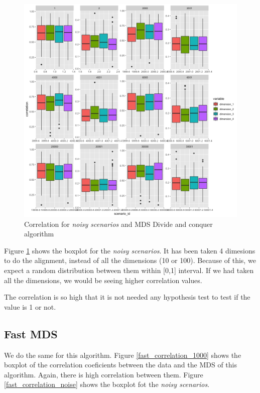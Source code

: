 \documentclass[11pt]{report}
\begin{document}
\begin{figure}[ht]
\centering
    \includegraphics{./images/divide_correlation_noise.png}
    \caption{Correlation for \textit{noisy scenarios} and MDS Divide and conquer algorithm}
    \label{divide_correlation_noise}
\end{figure}

\indent Figure \ref{divide_correlation_noise} shows the boxplot for the 
\textit{noisy scenarios}. It has been taken 4 dimesions to do the alignment, 
instead of all the dimensions (10 or 100). Because of this, we expect a random 
distribution between them within [0,1] interval. If we had taken all the 
dimensions, we would be seeing higher correlation values. 

\indent The correlation is so high that it is not needed any hypothesis test
to test if the value is 1 or not. 


\subsection{Fast MDS}
We do the same for this algorithm. Figure \ref{fast_correlation_1000} shows 
the boxplot of the correlation coeficients between the data and the MDS 
of this algorithm. Again, there is high correlation between them. 
Figure \ref{fast_correlation_noise} shows the boxplot fot the 
\textit{noisy scenarios}.
\end{document}
